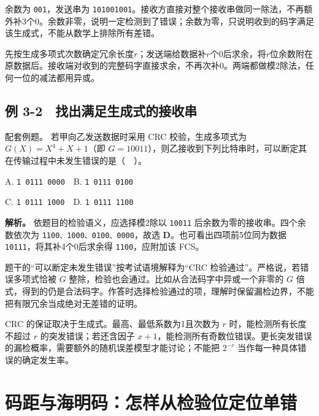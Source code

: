 余数为 \texttt{001}，发送串为 \texttt{101001001}。接收方直接对整个接收串做同一除法，不再额外补3个0。余数非零，说明一定检测到了错误；余数为零，只说明收到的码字满足该生成式，不能从数学上排除所有差错。

\begin{methodbox}[CRC的发送端与接收端分开算]

先按生成多项式次数确定冗余长度\(r\)；发送端给数据补\(r\)个0后求余，将\(r\)位余数附在原数据后。接收端对收到的完整码字直接求余，不再次补0。两端都做模2除法，任何一位的减法都用异或。

\end{methodbox}

\subsection{例 3-2　找出满足生成式的接收串}\label{CN03-ex2}

{\begin{example}[配套例题]

配套例题。 若甲向乙发送数据时采用 CRC 校验，生成多项式为 \(G(X)=X^4+X+1\)（即 \(G=10011\)），则乙接收到下列比特串时，可以断定其在传输过程中未发生错误的是（　）。

A. \texttt{1 0111 0000}　B. \texttt{1 0111 0100}

C. \texttt{1 0111 1000}　D. \texttt{1 0111 1100}

\end{example}}

\textbf{解析。} 依题目的检验语义，应选择模2除以 \texttt{10011} 后余数为零的接收串。四个余数依次为 \texttt{1100、1000、0100、0000}，故选 \textbf{D}。也可看出四项前5位同为数据 \texttt{10111}，将其补4个0后求余得 \texttt{1100}，应附加该 FCS。

题干的``可以断定未发生错误''按考试语境解释为``CRC 检验通过''。严格说，若错误多项式恰被 \(G\) 整除，检验也会通过。比如从合法码字中异或一个非零的 \(G\) 倍式，得到的仍是合法码字。作答时选择检验通过的项，理解时保留漏检边界，不能把有限冗余当成绝对无差错的证明。

CRC 的保证取决于生成式。最高、最低系数为1且次数为 \(r\) 时，能检测所有长度不超过 \(r\) 的突发错误；若还含因子 \(x+1\)，能检测所有奇数位错误。更长突发错误的漏检概率，需要额外的随机误差模型才能讨论；不能把 \(2^{-r}\) 当作每一种具体错误的确定发生率。

\section{码距与海明码：怎样从检验位定位单错}\label{CN03-04}

